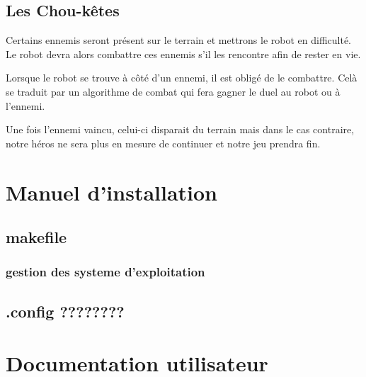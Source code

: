\documentclass[a4paper 12pts]{article}
\begin{document}
\subsection{Les Chou-kêtes}

Certains ennemis seront présent sur le terrain et mettrons le robot en difficulté. 
Le robot devra alors combattre ces ennemis s'il les rencontre afin de rester en vie.

Lorsque le robot se trouve à côté d'un ennemi, il est obligé de le combattre. 
Celà se traduit par un algorithme de combat qui fera gagner le duel au robot ou à l'ennemi. 

Une fois l'ennemi vaincu, celui-ci disparait du terrain mais dans le cas contraire, 
notre héros ne sera plus en mesure de continuer et notre jeu prendra fin.



\section{Manuel d'installation}

\subsection{makefile}



\subsubsection{gestion des systeme d'exploitation}

\subsection{.config ????????}


\section{Documentation utilisateur}

\end{document}
